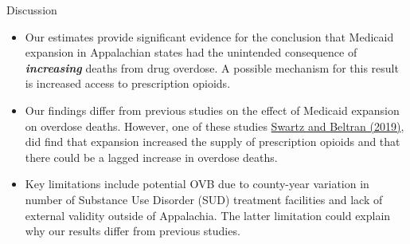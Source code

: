 \documentclass[
  ignorenonframetext,
]{beamer}
\begin{document}
\begin{frame}{Discussion}
\protect\hypertarget{discussion}{}
\begin{itemize}
\item
  Our estimates provide significant evidence for the conclusion that
  Medicaid expansion in Appalachian states had the unintended
  consequence of \textbf{\emph{increasing}} deaths from drug overdose. A
  possible mechanism for this result is increased access to prescription
  opioids.
\item
  Our findings differ from previous studies on the effect of Medicaid
  expansion on overdose deaths. However, one of these studies
  \href{https://onlinelibrary.wiley.com/doi/epdf/10.1111/add.14741}{Swartz
  and Beltran (2019)}, did find that expansion increased the supply of
  prescription opioids and that there could be a lagged increase in
  overdose deaths.
\item
  Key limitations include potential OVB due to county-year variation in
  number of Substance Use Disorder (SUD) treatment facilities and lack
  of external validity outside of Appalachia. The latter limitation
  could explain why our results differ from previous studies.
\end{itemize}
\end{frame}
\end{document}
